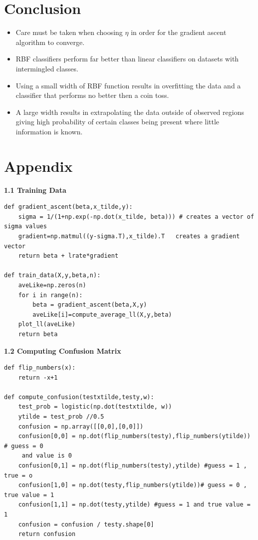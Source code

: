 \documentclass[twoside,twocolumn]{article}
\begin{document}
\section{Conclusion}
\begin{itemize}
\item Care must be taken when choosing $\eta$ in order for the gradient ascent algorithm to converge.
\item RBF classifiers perform far better than linear classifiers on datasets with intermingled classes.
\item Using a small width of RBF function results in overfitting the data and a classifier that performs no better then a coin toss.
\item A large width results in extrapolating the data outside of observed regions giving high probability of certain classes being present where little information is known. 
\end{itemize}


\section{Appendix}
\textbf{1.1 Training Data}
\small
\begin{lstlisting}
def gradient_ascent(beta,x_tilde,y):
    sigma = 1/(1+np.exp(-np.dot(x_tilde, beta))) # creates a vector of sigma values
    gradient=np.matmul((y-sigma.T),x_tilde).T   creates a gradient vector
    return beta + lrate*gradient

def train_data(X,y,beta,n):
    aveLike=np.zeros(n)
    for i in range(n):
        beta = gradient_ascent(beta,X,y)
        aveLike[i]=compute_average_ll(X,y,beta)
    plot_ll(aveLike)
    return beta
\end{lstlisting}
\textbf{1.2 Computing Confusion Matrix} 
\small
\begin{lstlisting}
def flip_numbers(x):
    return -x+1

def compute_confusion(testxtilde,testy,w):
    test_prob = logistic(np.dot(testxtilde, w))
    ytilde = test_prob //0.5
    confusion = np.array([[0,0],[0,0]])
    confusion[0,0] = np.dot(flip_numbers(testy),flip_numbers(ytilde)) # guess = 0
     and value is 0
    confusion[0,1] = np.dot(flip_numbers(testy),ytilde) #guess = 1 , true = o
    confusion[1,0] = np.dot(testy,flip_numbers(ytilde))# guess = 0 , true value = 1
    confusion[1,1] = np.dot(testy,ytilde) #guess = 1 and true value = 1
    confusion = confusion / testy.shape[0]
    return confusion 
\end{lstlisting}
\end{document}
